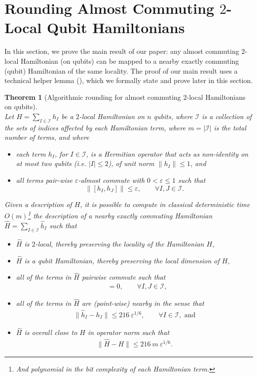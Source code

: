 \documentclass[11pt]{article}
\theoremstyle{plain}
\newtheorem{theorem}{Theorem}[section]
\newcommand{\eps}{\varepsilon}
\begin{document}
\section{Rounding Almost Commuting $2$-Local Qubit Hamiltonians}
In this section, we prove the main result of our paper: any almost commuting $2$-local Hamiltonian (on qubits) can be mapped to a nearby exactly commuting (qubit) Hamiltonian of the same locality. The proof of our main result uses a technical helper lemma (), which we formally state and prove later in this section.

\begin{theorem}[Algorithmic rounding for almost commuting $2$-local Hamiltonians on qubits]\label{thm:transforming-hamiltonian}\ \\
Let $H = \sum\limits_{I \in \mathcal{I}} h_{I}$ be a $2$-local 
Hamiltonian on $n$ qubits, where $\mathcal{I}$ is a collection of the sets of indices affected by each Hamiltonian term, where $m = |\mathcal{I}|$ is the total number of terms, and where
\begin{itemize}
    \item each term $h_{I}$, for $I \in \mathcal{I}$, is a Hermitian operator that acts as non-identity on at most two qubits (i.e. $|I| \leq 2$), of unit norm $\| h_I \| \leq 1$, and
    \item all terms pair-wise $\eps$-almost commute with $0 < \eps \leq 1$ such that
\[ \| [h_{I}, h_{J} ] \| \leq \eps, \quad\quad \forall I, J \in \mathcal{I}. \]
\end{itemize}
Given a description of $H$, it is possible to compute in classical deterministic time $O(m)$\footnote{And polynomial in the bit complexity of each Hamiltonian term.} the description of a nearby exactly commuting Hamiltonian $\hat{H} = \sum\limits_{I \in \mathcal{I}} \hat{h}_{I}$ such that 
\begin{itemize}
\item $\hat{H}$ is $2$-local, thereby preserving the locality of the Hamiltonian $H$,
\item $\hat{H}$ is a qubit Hamiltonian, thereby preserving the local dimension of $H$,
\item all of the terms in $\hat{H}$ pairwise commute such that
    \begin{align} 
[\hat{h}_{I}, \hat{h}_{J}] &= 0, \quad\quad \forall I, J \in \mathcal{I}, \label{eq:exact-commutation}
\end{align}
\item all of the terms in $\hat{H}$ are (point-wise) nearby in the sense that 
\begin{align}
\| \hat{h}_{I} - h_{I} \| \leq 216\ \eps^{1/6}, \quad\quad \forall I \in \mathcal{I}, \text{ and}\label{eq:overall-rounding-term-error}
\end{align}
\item $\hat{H}$ is overall close to $H$ in operator norm such that
\begin{align}
\|\hat{H} - H\| \leq 216\ m \ \eps^{1/6}.\label{eq:rounding-error}
\end{align}
\end{itemize}
\end{theorem}
\end{document}
